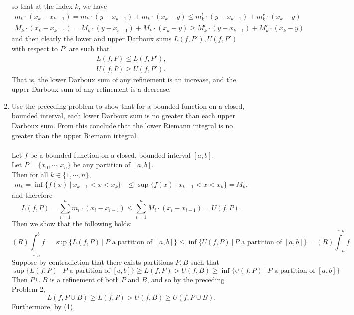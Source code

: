 \begin{enumerate}
    so that at the index $k$, we have
    \begin{align*}
        m_k\cdot (x_k-x_{k-1})=m_k\cdot (y-x_{k-1})+m_k\cdot (x_k-y)\le m_k^l\cdot (y-x_{k-1})+m_k^r\cdot (x_k-y)\\
        M_k\cdot (x_k-x_{k-1})=M_k\cdot (y-x_{k-1})+M_k\cdot (x_k-y)\ge M_k^l\cdot (y-x_{k-1})+M_k^r\cdot (x_k-y)
    \end{align*}
    and then clearly the lower and upper Darboux sums $L(f,P'),U(f,P')$ with respect to $P'$ are such that
    \begin{align*}
        L(f,P)\le L(f,P'),\\
        U(f,P)\ge U(f,P').
    \end{align*}
    That is, the lower Darboux sum of any refinement is an increase, and the upper Darboux sum of any refinement is a decrease.
    \item Use the preceding problem to show that for a bounded function on a closed, bounded interval, each lower Darboux sum is no greater than each upper Darboux sum.
    From this conclude that the lower Riemann integral is no greater than the upper Riemann integral.\\
    \\Let $f$ be a bounded function on a closed, bounded interval $[a,b]$.
    \\Let $P=\{x_0,\cdots,x_n\}$ be any partition of $[a,b]$.
    \\Then for all $k\in\{1,\cdots,n\}$,
    \begin{align*}
        m_k=\inf\{f(x)\ |\ x_{k-1}<x<x_k\}&\le \sup\{f(x)\ |\ x_{k-1}<x<x_k\}=M_k,
    \end{align*}
    and therefore 
    \begin{equation}
        L(f,P)=\sum_{i=1}^n m_i\cdot (x_i-x_{i-1})\le\sum_{i=1}^n M_i\cdot (x_i-x_{i-1})=U(f,P).\tag{1}
    \end{equation}
    Then we show that the following holds:
    \[
        (R)\underline\int_a^bf=\sup\biggl\{L(f,P)\ |\ P\text{ a partition of }[a,b]\biggr\}\le \inf\biggl\{U(f,P)\ |\ P\text{ a partition of }[a,b]\biggr\}=(R)\overline\int_a^bf
    \]
    Suppose by contradiction that there exists partitions $P,B$ such that 
    \[
        \sup\biggl\{L(f,P)\ |\ P\text{ a partition of }[a,b]\biggr\}\ge L(f,P)>U(f,B)\ge \inf\biggl\{U(f,P)\ |\ P\text{ a partition of }[a,b]\biggr\}
    \]
    Then $P\cup B$ is a refinement of both $P$ and $B$, and so by the preceding Problem 2,
    \[
        L(f,P\cup B)\ge L(f,P)>U(f,B)\ge U(f,P\cup B).
    \]
    Furthermore, by (1),

\end{enumerate}
